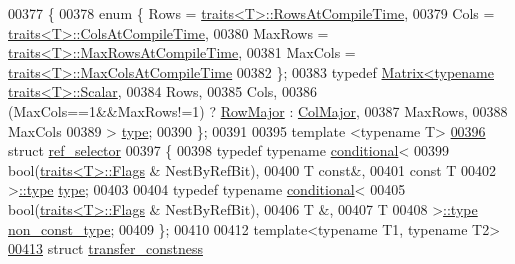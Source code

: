 \begin{DoxyCode}
{00377 \{
00378   \textcolor{keyword}{enum} \{ Rows = \hyperlink{struct_eigen_1_1internal_1_1traits}{traits<T>::RowsAtCompileTime},
00379          Cols = \hyperlink{struct_eigen_1_1internal_1_1traits}{traits<T>::ColsAtCompileTime},
00380          MaxRows = \hyperlink{struct_eigen_1_1internal_1_1traits}{traits<T>::MaxRowsAtCompileTime},
00381          MaxCols = \hyperlink{struct_eigen_1_1internal_1_1traits}{traits<T>::MaxColsAtCompileTime}
00382   \};
00383   \textcolor{keyword}{typedef} \hyperlink{group___core___module_class_eigen_1_1_matrix}{Matrix<typename traits<T>::Scalar},
00384                 Rows,
00385                 Cols,
00386                 (MaxCols==1&&MaxRows!=1) ? \hyperlink{group__enums_ggaacded1a18ae58b0f554751f6cdf9eb13acfcde9cd8677c5f7caf6bd603666aae3}{RowMajor} : \hyperlink{group__enums_ggaacded1a18ae58b0f554751f6cdf9eb13a0cbd4bdd0abcfc0224c5fcb5e4f6669a}{ColMajor},
00387                 MaxRows,
00388                 MaxCols
00389           > \hyperlink{group___core___module_class_eigen_1_1_matrix}{type};
00390 \};
00391 
00395 \textcolor{keyword}{template} <\textcolor{keyword}{typename} T>
\hyperlink{struct_eigen_1_1internal_1_1ref__selector}{00396} \textcolor{keyword}{struct }\hyperlink{struct_eigen_1_1internal_1_1ref__selector}{ref\_selector}
00397 \{
00398   \textcolor{keyword}{typedef} \textcolor{keyword}{typename} \hyperlink{struct_eigen_1_1internal_1_1conditional}{conditional}<
00399     bool(\hyperlink{struct_eigen_1_1internal_1_1traits}{traits<T>::Flags} & NestByRefBit),
00400     T \textcolor{keyword}{const}&,
00401     \textcolor{keyword}{const} T
00402   >\hyperlink{class_eigen_1_1internal_1_1_tensor_lazy_evaluator_writable}{::type} \hyperlink{class_eigen_1_1internal_1_1_tensor_lazy_evaluator_writable}{type};
00403   
00404   \textcolor{keyword}{typedef} \textcolor{keyword}{typename} \hyperlink{struct_eigen_1_1internal_1_1conditional}{conditional}<
00405     bool(\hyperlink{struct_eigen_1_1internal_1_1traits}{traits<T>::Flags} & NestByRefBit),
00406     T &,
00407     T
00408   >\hyperlink{class_eigen_1_1internal_1_1_tensor_lazy_evaluator_writable}{::type} \hyperlink{class_eigen_1_1internal_1_1_tensor_lazy_evaluator_writable}{non\_const\_type};
00409 \};
00410 
00412 \textcolor{keyword}{template}<\textcolor{keyword}{typename} T1, \textcolor{keyword}{typename} T2>
\hyperlink{struct_eigen_1_1internal_1_1transfer__constness}{00413} \textcolor{keyword}{struct }\hyperlink{struct_eigen_1_1internal_1_1transfer__constness}{transfer\_constness}
}
\end{DoxyCode}
